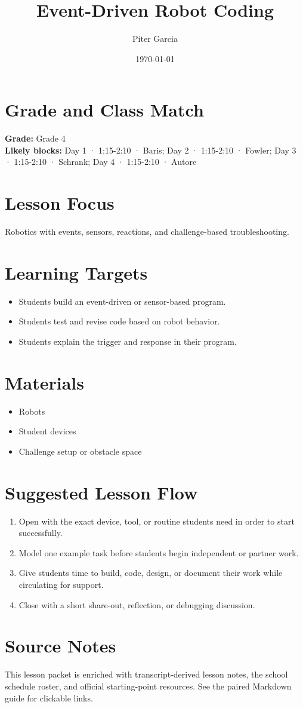 \documentclass[11pt]{article}
\title{Event-Driven Robot Coding}
\author{Piter Garcia}
\date{\today}
\begin{document}
\maketitle

\section*{Grade and Class Match}
\textbf{Grade:} Grade 4\\
\textbf{Likely blocks:} Day 1 · 1:15-2:10 · Baris; Day 2 · 1:15-2:10 · Fowler; Day 3 · 1:15-2:10 · Schrank; Day 4 · 1:15-2:10 · Autore

\section*{Lesson Focus}
Robotics with events, sensors, reactions, and challenge-based troubleshooting.

\section*{Learning Targets}
\begin{itemize}[leftmargin=*]
\item Students build an event-driven or sensor-based program.
\item Students test and revise code based on robot behavior.
\item Students explain the trigger and response in their program.
\end{itemize}

\section*{Materials}
\begin{itemize}[leftmargin=*]
\item Robots
\item Student devices
\item Challenge setup or obstacle space
\end{itemize}

\section*{Suggested Lesson Flow}
\begin{enumerate}[leftmargin=*]
\item Open with the exact device, tool, or routine students need in order to start successfully.
\item Model one example task before students begin independent or partner work.
\item Give students time to build, code, design, or document their work while circulating for support.
\item Close with a short share-out, reflection, or debugging discussion.
\end{enumerate}

\section*{Source Notes}
This lesson packet is enriched with transcript-derived lesson notes, the school schedule roster, and official starting-point resources. See the paired Markdown guide for clickable links.



\end{document}
